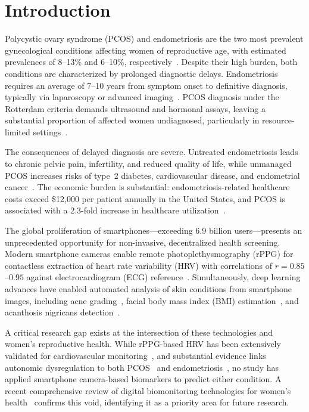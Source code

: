 \documentclass[conference]{IEEEtran}
\begin{document}
\section{Introduction}

Polycystic ovary syndrome (PCOS) and endometriosis are the two most prevalent gynecological conditions affecting women of reproductive age, with estimated prevalences of 8--13\% and 6--10\%, respectively~\cite{Wang_2025, Pavic_2025}. Despite their high burden, both conditions are characterized by prolonged diagnostic delays. Endometriosis requires an average of 7--10 years from symptom onset to definitive diagnosis, typically via laparoscopy or advanced imaging~\cite{Zhang_2026}. PCOS diagnosis under the Rotterdam criteria demands ultrasound and hormonal assays, leaving a substantial proportion of affected women undiagnosed, particularly in resource-limited settings~\cite{Arabkermani_2025}.

The consequences of delayed diagnosis are severe. Untreated endometriosis leads to chronic pelvic pain, infertility, and reduced quality of life, while unmanaged PCOS increases risks of type~2 diabetes, cardiovascular disease, and endometrial cancer~\cite{Wang_2025}. The economic burden is substantial: endometriosis-related healthcare costs exceed \$12,000 per patient annually in the United States, and PCOS is associated with a 2.3-fold increase in healthcare utilization~\cite{Moghimikandelousi_2025}.

The global proliferation of smartphones---exceeding 6.9 billion users---presents an unprecedented opportunity for non-invasive, decentralized health screening. Modern smartphone cameras enable remote photoplethysmography (rPPG) for contactless extraction of heart rate variability (HRV) with correlations of $r=0.85$--$0.95$ against electrocardiogram (ECG) reference~\cite{rppgreview2024frontiers}. Simultaneously, deep learning advances have enabled automated analysis of skin conditions from smartphone images, including acne grading~\cite{Huynh_2022}, facial body mass index (BMI) estimation~\cite{Yousaf_2021}, and acanthosis nigricans detection~\cite{Dhanoo_2024}.

A critical research gap exists at the intersection of these technologies and women's reproductive health. While rPPG-based HRV has been extensively validated for cardiovascular monitoring~\cite{debnath2025comprehensive, luo2019smartphone}, and substantial evidence links autonomic dysregulation to both PCOS~\cite{Mirzohreh_2024} and endometriosis~\cite{Hao_2021, Moreira_2021}, no study has applied smartphone camera-based biomarkers to predict either condition. A recent comprehensive review of digital biomonitoring technologies for women's health~\cite{Moghimikandelousi_2025} confirms this void, identifying it as a priority area for future research.
\end{document}
